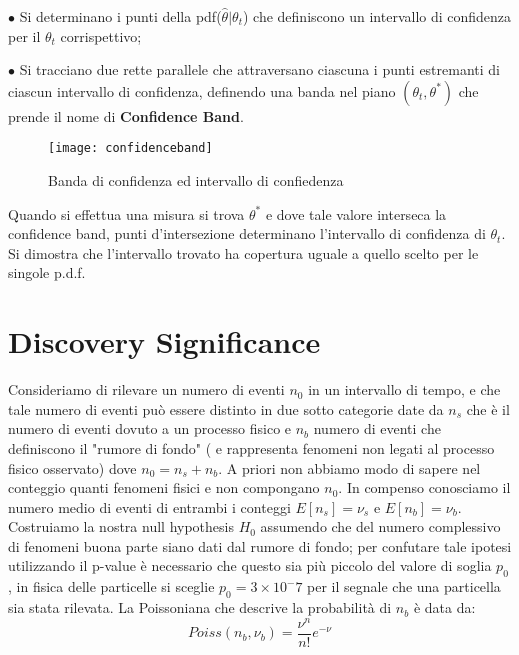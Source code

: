 \documentclass[11pt,a4paper]{book}
\begin{document}
\noindent $\bullet$ Si determinano i punti della pdf($\hat{\theta} \vert \theta_t$) che definiscono un intervallo di confidenza per il $\theta_t$ corrispettivo;\newline

\noindent $\bullet$ Si tracciano due rette parallele che attraversano ciascuna i punti estremanti di ciascun intervallo di confidenza, definendo una banda nel piano $(\theta_t,\theta^*)$ che prende il nome di \textbf{Confidence Band}.
\begin{figure}[ht]
\vspace{0.2in}
\texttt{[image: confidenceband]}	
\centering
\caption{Banda di confidenza ed intervallo di confiedenza}
\end{figure}

\noindent Quando si effettua una misura si trova $\theta^*$ e dove tale valore interseca la confidence band, punti
d'intersezione determinano l'intervallo di confidenza di $\theta_t$. Si dimostra che l'intervallo trovato ha copertura uguale a quello scelto per le singole p.d.f.


\section{Discovery Significance}

Consideriamo di rilevare un numero di eventi $n_0$ in un intervallo di tempo, e che tale numero di eventi pu\`{o} essere distinto in due sotto categorie date da $n_s$ che \`{e} il numero di eventi dovuto a un processo fisico e $n_b$ numero di eventi che definiscono il "rumore di fondo" ( e rappresenta fenomeni non legati al processo fisico osservato) dove $n_0 = n_s + n_b$. A priori non abbiamo modo di sapere nel conteggio quanti fenomeni fisici e non compongano $n_0$. In compenso conosciamo il numero medio di eventi di entrambi i conteggi $E[n_s] = \nu_s$ e $E[n_b] = \nu_b$. \newline
Costruiamo la nostra null hypothesis $H_0$ assumendo che del numero complessivo di fenomeni buona parte siano dati dal rumore di fondo; per confutare tale ipotesi utilizzando il p-value \`{e} necessario che questo sia pi\`{u} piccolo del valore di soglia $p_0$, in fisica delle particelle si sceglie $p_0 = 3 \times 10^-7$ per il segnale che una particella sia stata rilevata. La Poissoniana che  descrive la probabilit\`{a} di $n_b$ \`{e} data da:
\begin{equation*}
	Poiss(n_b,\nu_b) = \dfrac{\nu^n}{n!}e^{-\nu}
\end{equation*} 
\end{document}
